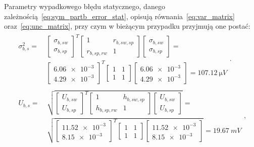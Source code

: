 Parametry wypadkowego błędu statycznego, danego zależnością~\eqref{eq:sym_partb_error_stat}, opisują równania~\eqref{eq:var_matrix} oraz~\eqref{eq:unc_matrix}, przy czym w bieżącym przypadku przyjmują one postać:
\begin{gather}
\begin{split}
\sigma_{b,s}^{2} = ~ &
\begin{bmatrix}
\sigma_{b,sw} \\ \sigma_{b,sp}
\end{bmatrix}^{T}
\begin{bmatrix}
1 & r_{b,sw,sp} \\
r_{b,sp,rw} & 1
\end{bmatrix}
\begin{bmatrix}
\sigma_{b,sw} \\ \sigma_{b,sp}
\end{bmatrix} = \\ &
\begin{bmatrix}
\num{6.06e-3} \\ \num{4.29e-3}
\end{bmatrix}^{T}
\begin{bmatrix}
1 & 1 \\
1 & 1
\end{bmatrix}
\begin{bmatrix}
\num{6.06e-3} \\ \num{4.29e-3}
\end{bmatrix} = \qty{107.12}{\micro V}
\end{split}
\label{eq:sym_partb_stat_var}. \\
\begin{split}
U_{b,s} = ~ & \sqrt{
\begin{bmatrix}
U_{b,sw} \\ U_{b,sp}
\end{bmatrix}^{T}
\begin{bmatrix}
1 & h_{b,sw,sp} \\
h_{b,sp,rw} & 1
\end{bmatrix}
\begin{bmatrix}
U_{b,sw} \\ U_{b,sp}
\end{bmatrix}} = \\ & \sqrt{
\begin{bmatrix}
\num{11.52e-3} \\ \num{8.15e-3}
\end{bmatrix}^{T}
\begin{bmatrix}
1 & 1 \\
1 & 1
\end{bmatrix}
\begin{bmatrix}
\num{11.52e-3} \\ \num{8.15e-3}
\end{bmatrix}} = \qty{19.67}{mV}
\end{split}
\label{eq:sym_partb_stat_uncert},
\end{gather}
